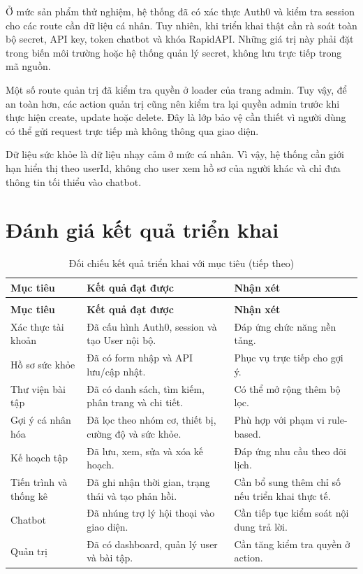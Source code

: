 Ở mức sản phẩm thử nghiệm, hệ thống đã có xác thực Auth0 và kiểm tra session cho các route cần dữ liệu cá nhân. Tuy nhiên, khi triển khai thật cần rà soát toàn bộ secret, API key, token chatbot và khóa RapidAPI. Những giá trị này phải đặt trong biến môi trường hoặc hệ thống quản lý secret, không lưu trực tiếp trong mã nguồn.


Một số route quản trị đã kiểm tra quyền ở loader của trang admin. Tuy vậy, để an toàn hơn, các action quản trị cũng nên kiểm tra lại quyền admin trước khi thực hiện create, update hoặc delete. Đây là lớp bảo vệ cần thiết vì người dùng có thể gửi request trực tiếp mà không thông qua giao diện.


Dữ liệu sức khỏe là dữ liệu nhạy cảm ở mức cá nhân. Vì vậy, hệ thống cần giới hạn hiển thị theo userId, không cho user xem hồ sơ của người khác và chỉ đưa thông tin tối thiểu vào chatbot.


\section{Đánh giá kết quả triển khai}

\begingroup
\setlength{\tabcolsep}{3pt}
\renewcommand{\arraystretch}{1.25}
\begin{longtable}{|P{0.220\textwidth}|P{0.330\textwidth}|P{0.370\textwidth}|}
\caption{Đối chiếu kết quả triển khai với mục tiêu}\\
\hline
\textbf{Mục tiêu} & \textbf{Kết quả đạt được} & \textbf{Nhận xét} \\
\hline
\endfirsthead
\caption[]{Đối chiếu kết quả triển khai với mục tiêu (tiếp theo)}\\
\hline
\textbf{Mục tiêu} & \textbf{Kết quả đạt được} & \textbf{Nhận xét} \\
\hline
\endhead
Xác thực tài khoản & Đã cấu hình Auth0, session và tạo User nội bộ. & Đáp ứng chức năng nền tảng. \\
\hline
Hồ sơ sức khỏe & Đã có form nhập và API lưu/cập nhật. & Phục vụ trực tiếp cho gợi ý. \\
\hline
Thư viện bài tập & Đã có danh sách, tìm kiếm, phân trang và chi tiết. & Có thể mở rộng thêm bộ lọc. \\
\hline
Gợi ý cá nhân hóa & Đã lọc theo nhóm cơ, thiết bị, cường độ và sức khỏe. & Phù hợp với phạm vi rule-based. \\
\hline
Kế hoạch tập & Đã lưu, xem, sửa và xóa kế hoạch. & Đáp ứng nhu cầu theo dõi lịch. \\
\hline
Tiến trình và thống kê & Đã ghi nhận thời gian, trạng thái và tạo phản hồi. & Cần bổ sung thêm chỉ số nếu triển khai thực tế. \\
\hline
Chatbot & Đã nhúng trợ lý hội thoại vào giao diện. & Cần tiếp tục kiểm soát nội dung trả lời. \\
\hline
Quản trị & Đã có dashboard, quản lý user và bài tập. & Cần tăng kiểm tra quyền ở action. \\
\hline
\end{longtable}
\endgroup

